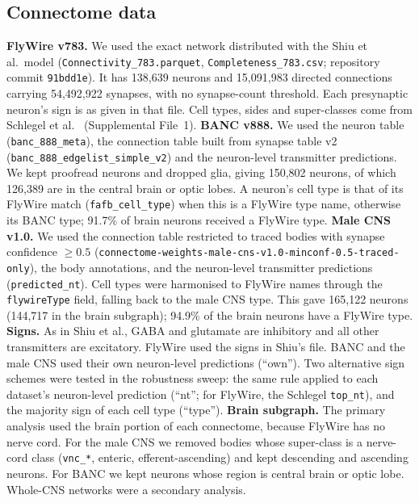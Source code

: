 \subsection*{Connectome data}
\textbf{FlyWire v783.} We used the exact network distributed with the Shiu et al.\ model
(\texttt{Connectivity\_783.parquet}, \texttt{Completeness\_783.csv}; repository commit
\texttt{91bdd1e}). It has 138{,}639 neurons and 15{,}091{,}983 directed connections carrying
54{,}492{,}922 synapses, with no synapse-count threshold. Each presynaptic neuron's sign is as
given in that file. Cell types, sides and super-classes come from Schlegel et al.\
\citep{schlegel2024} (Supplemental File~1).
\textbf{BANC v888.} We used the neuron table (\texttt{banc\_888\_meta}), the connection
table built from synapse table v2 (\texttt{banc\_888\_edgelist\_simple\_v2}) and the
neuron-level transmitter predictions. We kept proofread neurons and dropped glia, giving
150{,}802 neurons, of which 126{,}389 are in the central brain or optic lobes. A neuron's
cell type is that of its FlyWire match (\texttt{fafb\_cell\_type}) when this is a FlyWire
type name, otherwise its BANC type; 91.7\% of brain neurons received a FlyWire type.
\textbf{Male CNS v1.0.} We used the connection table restricted to traced bodies with synapse
confidence $\ge0.5$
(\texttt{connectome-weights-male-cns-v1.0-minconf-0.5-traced-only}), the body annotations,
and the neuron-level transmitter predictions (\texttt{predicted\_nt}). Cell types were
harmonised to FlyWire names through the \texttt{flywireType} field, falling back to the male
CNS type. This gave 165{,}122 neurons (144{,}717 in the brain subgraph); 94.9\% of the
brain neurons have a FlyWire type.
\textbf{Signs.} As in Shiu et al., GABA and glutamate are inhibitory and all other
transmitters are excitatory. FlyWire used the signs in Shiu's file. BANC and the male CNS used
their own neuron-level predictions (``own''). Two alternative sign schemes were tested in the
robustness sweep: the same rule applied to each dataset's neuron-level prediction (``nt'';
for FlyWire, the Schlegel \texttt{top\_nt}), and the majority sign of each cell type
(``type'').
\textbf{Brain subgraph.} The primary analysis used the brain portion of each connectome,
because FlyWire has no nerve cord. For the male CNS we removed bodies whose super-class is a
nerve-cord class (\texttt{vnc\_*}, enteric, efferent-ascending) and kept descending and
ascending neurons. For BANC we kept neurons whose region is central brain or optic lobe. Whole-CNS networks were a secondary analysis.

